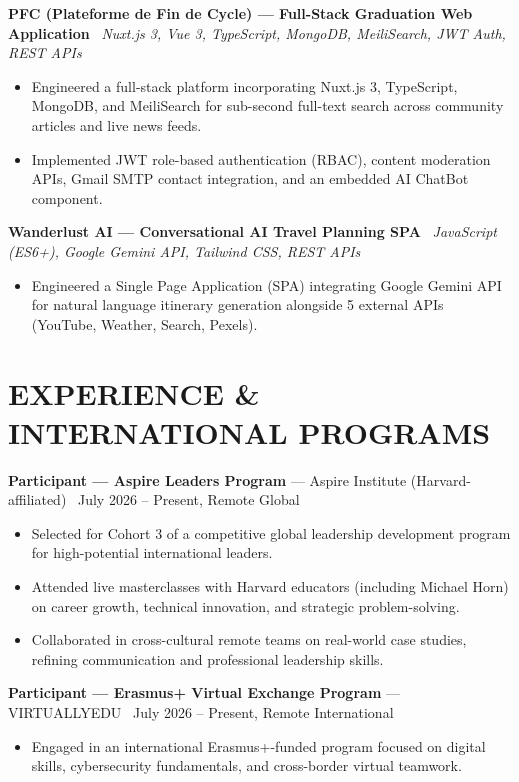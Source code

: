 \documentclass[10pt, letterpaper]{article}
\newcommand{\entry}[4]{%
  \noindent\textbf{#1} --- #3 \textbar\ #2, #4\par
  \vspace{2pt}
}
\newcommand{\projectentry}[2]{%
  \noindent\textbf{#1} \textbar\ \textit{#2}\par
  \vspace{2pt}
}
\newcommand{\resumeItem}[1]{\item #1}
\begin{document}
\projectentry{PFC (Plateforme de Fin de Cycle) --- Full-Stack Graduation Web Application}{Nuxt.js 3, Vue 3, TypeScript, MongoDB, MeiliSearch, JWT Auth, REST APIs}
\begin{itemize}
  \resumeItem{Engineered a full-stack platform incorporating Nuxt.js 3, TypeScript, MongoDB, and MeiliSearch for sub-second full-text search across community articles and live news feeds.}
  \resumeItem{Implemented JWT role-based authentication (RBAC), content moderation APIs, Gmail SMTP contact integration, and an embedded AI ChatBot component.}
\end{itemize}

\projectentry{Wanderlust AI --- Conversational AI Travel Planning SPA}{JavaScript (ES6+), Google Gemini API, Tailwind CSS, REST APIs}
\begin{itemize}
  \resumeItem{Engineered a Single Page Application (SPA) integrating Google Gemini API for natural language itinerary generation alongside 5 external APIs (YouTube, Weather, Search, Pexels).}
\end{itemize}

\section{EXPERIENCE \& INTERNATIONAL PROGRAMS}

\entry{Participant --- Aspire Leaders Program}{July 2026 -- Present}{Aspire Institute (Harvard-affiliated)}{Remote Global}
\begin{itemize}
  \resumeItem{Selected for Cohort 3 of a competitive global leadership development program for high-potential international leaders.}
  \resumeItem{Attended live masterclasses with Harvard educators (including Michael Horn) on career growth, technical innovation, and strategic problem-solving.}
  \resumeItem{Collaborated in cross-cultural remote teams on real-world case studies, refining communication and professional leadership skills.}
\end{itemize}

\entry{Participant --- Erasmus+ Virtual Exchange Program}{July 2026 -- Present}{VIRTUALLYEDU}{Remote International}
\begin{itemize}
  \resumeItem{Engaged in an international Erasmus+-funded program focused on digital skills, cybersecurity fundamentals, and cross-border virtual teamwork.}
\end{itemize}
\end{document}
